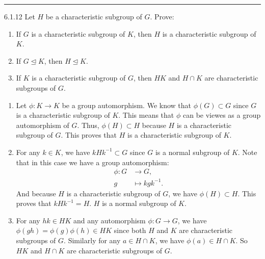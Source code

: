 \documentclass[a4paper, 12pt]{article}
\begin{document}
\noindent\rule{7in}{2.8pt}
\begin{problem}{6.1.12}
Let \(H\) be a characteristic subgroup of \(G\). Prove:
\begin{enumerate}[(1)]
\item If \(G\) is a characteristic subgroup of \(K\), then \(H\) is a characteristic subgroup of \(K\).
\item If \(G\unlhd K\), then \(H\unlhd K\).
\item If \(K\) is a characteristic subgroup of \(G\), then \(HK\) and \(H\cap K\) are characteristic subgroups of \(G\).
\end{enumerate}
\end{problem}
\begin{solution}
\begin{enumerate}[(1)]
\item Let \(\phi:K\rightarrow K\) be a group automorphism. We know that \(\phi(G)\subset G\) since \(G\) is a characteristic subgroup of \(K\). This means that \(\phi\) can be viewes as a group 
automorphism of \(G\). Thus, \(\phi(H)\subset H\) because \(H\) is a characteristic subgroup of \(G\). This proves that \(H\) is a characteristic subgroup of \(K\). 
\item For any \(k\in K\), we have \(kHk^{-1}\subset G\) since \(G\) is a normal subgroup of \(K\). Note that in this case we have a group automorphism:
\begin{align*}
    \phi:G&\rightarrow G,\\ 
    g&\mapsto kgk^{-1}.
\end{align*}
And because \(H\) is a characteristic subgroup of \(G\), we have \(\phi(H)\subset H\). This proves that \(kHk^{-1}=H\). \(H\) is a normal subgroup of \(K\). 
\item For any \(hk\in HK\) and any automorphism \(\phi:G\rightarrow G\), we have \(\phi(gh)=\phi(g)\phi(h)\in HK\) since both \(H\) and \(K\) are characteristic subgroups of \(G\). Similarly for any \(a\in H\cap K\), we have 
\(\phi(a)\in H\cap K\). So \(HK\) and \(H\cap K\) are characteristic subgroups of \(G\). 
\end{enumerate}
\end{solution}
\end{document}
